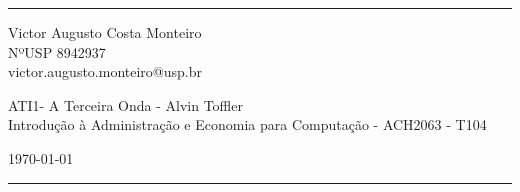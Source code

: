 \documentclass[a4paper]{article}
\begin{document}

\fancyhead[C]{}
\hrule \medskip %
\begin{minipage}{0.295\textwidth} 
    \raggedright
    \footnotesize
    Victor Augusto Costa Monteiro \hfill\\   
    NºUSP 8942937 \hfill\\
    victor.augusto.monteiro@usp.br
\end{minipage}
\begin{minipage}{0.4\textwidth} 
    \centering 
    \large 
    ATI1- A Terceira Onda - Alvin Toffler\\ 
    \normalsize 
    Introdução à Administração e Economia para Computação - ACH2063 - T104\\ 
\end{minipage}
\begin{minipage}{0.295\textwidth} 
    \raggedleft
    \today\hfill\\
\end{minipage}
\medskip\hrule 












\printbibliography
\end{document}
